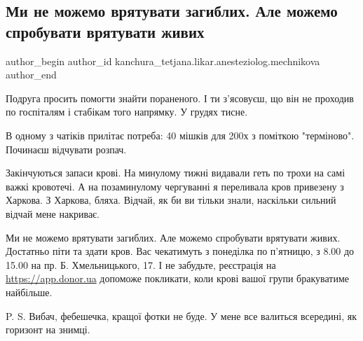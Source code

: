  
 
 
 
 

\subsection{Ми не можемо врятувати загиблих. Але можемо спробувати врятувати живих}
\label{sec:13_01_2023.fb.kanchura_tetjana.likar.anesteziolog.mechnikova.1.mi_ne_mozhemo_vryatu}

\ifcmt
 author_begin
   author_id kanchura_tetjana.likar.anesteziolog.mechnikova
 author_end
\fi

Подруга просить помогти знайти пораненого. І ти з'ясовуєш, що він не проходив
по госпіталям і стабікам того напрямку. У грудях тисне.

В одному з чатіків прилітає потреба: 40 мішків для 200х з поміткою "терміново".
Починаєш відчувати розпач.

Закінчуються запаси крові. На минулому тижні видавали геть по трохи на самі
важкі кровотечі. А на позаминулому чергуванні я переливала кров привезену з
Харкова. З Харкова, бляха. Відчай, як би ви тільки знали, наскільки сильний
відчай мене накриває.

Ми не можемо врятувати загиблих. Але можемо спробувати врятувати живих.
Достатньо піти та здати кров. Вас чекатимуть з понеділка по п'ятницю, з 8.00 до
15.00 на пр. Б. Хмельницького, 17. І не забудьте, реєстрація на
\url{https://app.donor.ua} допоможе покликати, коли крові вашої групи бракуватиме
найбільше. 

P. S. Вибач, фебешечка, кращої фотки не буде. У мене все валиться всередині, як
горизонт на знимці.
